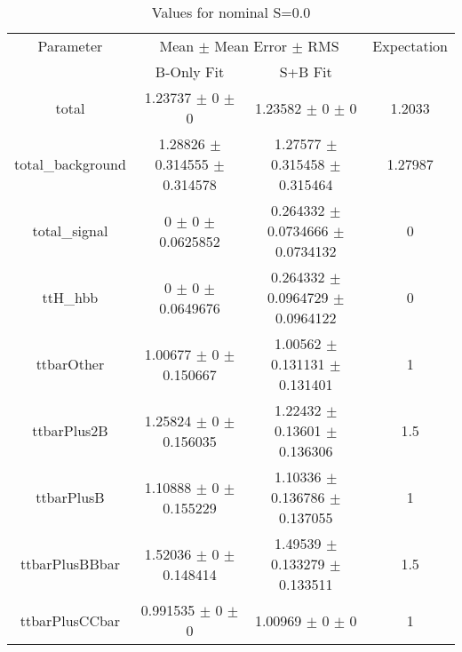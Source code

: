 \begin{table}
\centering
\caption{Values for nominal S=0.0}
\begin{tabular}{cccc}
\toprule
Parameter & \multicolumn{2}{c}{Mean $\pm$ Mean Error $\pm$ RMS} & Expectation\\
 & B-Only Fit & S+B Fit & \\
\midrule
total & \num{1.23737} $\pm$ \num{0} $\pm$ \num{0} & \num{1.23582} $\pm$ \num{0} $\pm$ \num{0} & \num{1.2033}\\
total\_background & \num{1.28826} $\pm$ \num{0.314555} $\pm$ \num{0.314578} & \num{1.27577} $\pm$ \num{0.315458} $\pm$ \num{0.315464} & \num{1.27987}\\
total\_signal & \num{0} $\pm$ \num{0} $\pm$ \num{0.0625852} & \num{0.264332} $\pm$ \num{0.0734666} $\pm$ \num{0.0734132} & \num{0}\\
ttH\_hbb & \num{0} $\pm$ \num{0} $\pm$ \num{0.0649676} & \num{0.264332} $\pm$ \num{0.0964729} $\pm$ \num{0.0964122} & \num{0}\\
ttbarOther & \num{1.00677} $\pm$ \num{0} $\pm$ \num{0.150667} & \num{1.00562} $\pm$ \num{0.131131} $\pm$ \num{0.131401} & \num{1}\\
ttbarPlus2B & \num{1.25824} $\pm$ \num{0} $\pm$ \num{0.156035} & \num{1.22432} $\pm$ \num{0.13601} $\pm$ \num{0.136306} & \num{1.5}\\
ttbarPlusB & \num{1.10888} $\pm$ \num{0} $\pm$ \num{0.155229} & \num{1.10336} $\pm$ \num{0.136786} $\pm$ \num{0.137055} & \num{1}\\
ttbarPlusBBbar & \num{1.52036} $\pm$ \num{0} $\pm$ \num{0.148414} & \num{1.49539} $\pm$ \num{0.133279} $\pm$ \num{0.133511} & \num{1.5}\\
ttbarPlusCCbar & \num{0.991535} $\pm$ \num{0} $\pm$ \num{0} & \num{1.00969} $\pm$ \num{0} $\pm$ \num{0} & \num{1}\\
\bottomrule
\end{tabular}
\end{table}